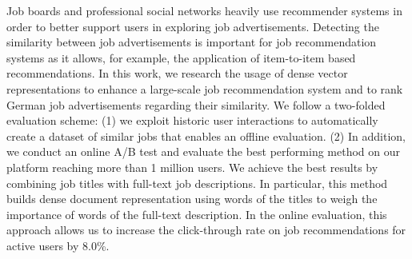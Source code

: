 Job boards and professional social networks heavily use recommender systems in order to better support users in exploring job advertisements. Detecting the similarity between job advertisements is important for job recommendation systems as it allows, for example, the application of item-to-item based recommendations. In this work, we research the usage of dense vector representations to enhance a large-scale job recommendation system and to rank German job advertisements regarding their similarity. We follow a two-folded evaluation scheme: (1) we exploit historic user interactions to automatically create a dataset of similar jobs that enables an offline evaluation. (2) In addition, we conduct an online A/B test and evaluate the best performing method on our platform reaching more than 1 million users. We achieve the best results by combining job titles with full-text job descriptions. In particular, this method builds dense document representation using words of the titles to weigh the importance of words of the full-text description. In the online evaluation, this approach allows us to increase the click-through rate on job recommendations for active users by 8.0\%.
